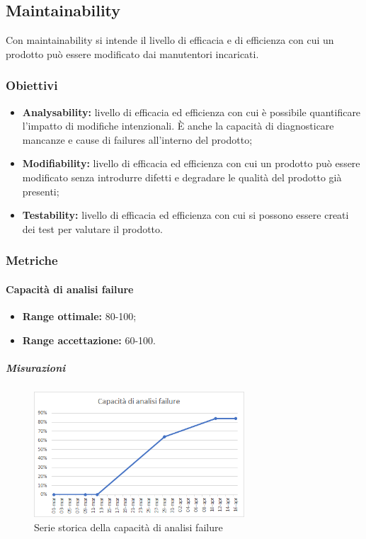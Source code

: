	\subsection{Maintainability}
		Con maintainability si intende il livello di efficacia e di efficienza con cui un prodotto può essere modificato dai manutentori incaricati.
		\subsubsection{Obiettivi}
		\begin{itemize}
			\item {\textbf{Analysability:} livello di efficacia ed efficienza con cui è possibile quantificare l'impatto di modifiche intenzionali. È anche la capacità di diagnosticare mancanze e cause di failures all'interno del prodotto; }
			\item{\textbf{Modifiability:} livello di efficacia ed efficienza con cui un prodotto può essere modificato senza introdurre difetti e degradare le qualità del prodotto già presenti;}
			\item{\textbf{Testability:} livello di efficacia ed efficienza con cui si possono essere creati dei test per valutare il prodotto.}
		\end{itemize}
		\subsubsection{Metriche}
			\paragraph{Capacità di analisi failure} \Spazio
			\begin{itemize}
				\item {\textbf{Range ottimale:} 80-100;}
				\item {\textbf{Range accettazione:} 60-100.}
			\end{itemize} 
		     \subparagraph{Misurazioni}
		    \begin{figure}[H]
		    	\centering 
		    	\includegraphics[width=0.7\textwidth]{Images/cap.png}
		    	\caption{Serie storica della capacità di analisi failure}
		    	\label{cap} 
		    \end{figure}

